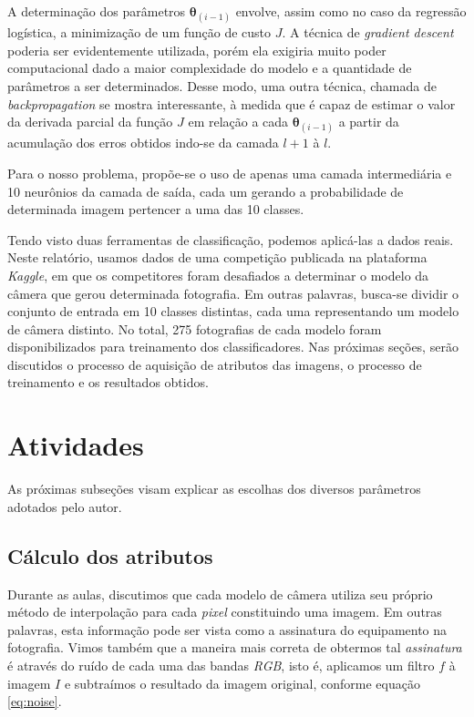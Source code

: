 \documentclass[10pt,twocolumn,letterpaper]{article}
\begin{document}
A determinação dos parâmetros \(\bm{\theta}_{(i-1)}\) envolve, assim como no caso da regressão logística, a minimização de um função de custo \(J\). A técnica de \textit{gradient descent} poderia ser evidentemente utilizada, porém ela exigiria muito poder computacional dado a maior complexidade do modelo e a quantidade de parâmetros a ser determinados. Desse modo, uma outra técnica, chamada de \textit{backpropagation} se mostra interessante, à medida que é capaz de estimar o valor da derivada parcial da função \(J\) em relação a cada \(\bm{\theta}_{(i-1)}\) a partir da acumulação dos erros obtidos indo-se da camada \(l+1\) à \(l\).

Para o nosso problema, propõe-se o uso de apenas uma camada intermediária e 10 neurônios da camada de saída, cada um gerando a probabilidade de determinada imagem pertencer a uma das 10 classes.

Tendo visto duas ferramentas de classificação, podemos aplicá-las a dados reais. Neste relatório, usamos dados de uma competição publicada na plataforma \textit{Kaggle}, em que os competitores foram desafiados a determinar o modelo da câmera que gerou determinada fotografia. Em outras palavras, busca-se dividir o conjunto de entrada em 10 classes distintas, cada uma representando um modelo de câmera distinto. No total, 275 fotografias de cada modelo foram disponibilizados para treinamento dos classificadores. Nas próximas seções, serão discutidos o processo de aquisição de atributos das imagens, o processo de treinamento e os resultados obtidos.

\section{Atividades}

As próximas subseções visam explicar as escolhas dos diversos parâmetros adotados pelo autor.

\subsection{Cálculo dos atributos}

Durante as aulas, discutimos que cada modelo de câmera utiliza seu próprio método de interpolação para cada \textit{pixel} constituindo uma imagem. Em outras palavras, esta informação pode ser vista como a assinatura do equipamento na fotografia. Vimos também que a maneira mais correta de obtermos tal \textit{assinatura} é através do ruído de cada uma das bandas \textit{RGB}, isto é, aplicamos um filtro  \(f\) à imagem \(I\) e subtraímos o resultado da imagem original, conforme equação \ref{eq:noise}.
\end{document}
